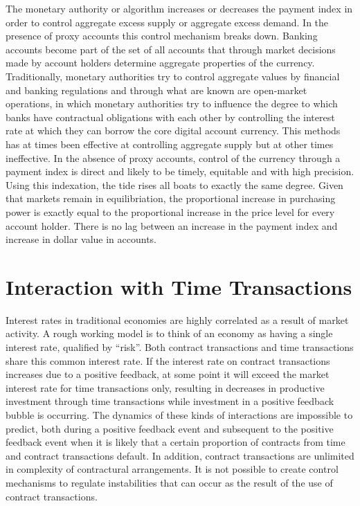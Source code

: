 The monetary authority or algorithm increases or decreases the payment index in order to control
aggregate excess supply or aggregate excess demand. In the presence of proxy accounts this control
mechanism breaks down. Banking accounts become part of the set of all accounts that through market
decisions made by account holders determine aggregate properties of the currency. Traditionally,
monetary authorities try to control aggregate values by financial and banking regulations and
through what are known are open-market operations, in which monetary authorities try to influence
the degree to which banks have contractual obligations with each other by controlling the interest
rate at which they can borrow the core digital account currency. This methods has at times been
effective at controlling aggregate supply but at other times ineffective. In the absence of proxy
accounts, control of the currency through a payment index is direct and likely to be timely,
equitable and with high precision. Using this indexation, the tide rises all boats to exactly the
same degree. Given that markets remain in equilibriation, the proportional increase in purchasing
power is exactly equal to the proportional increase in the price level for every account holder.
There is no lag between an increase in the payment index and increase in dollar value in accounts.   

\section{Interaction with Time Transactions}

Interest rates in traditional economies are highly correlated as a result of market activity. A
rough working model is to think of an economy as having a single interest rate, qualified by
``risk''.  Both contract transactions and time transactions share this common interest rate. If the
interest rate on contract transactions increases due to a positive feedback, at some point
it will exceed the market interest rate for time transactions only, resulting in decreases in
productive investment through time transactions while investment in a positive feedback bubble is
occurring. The dynamics of these kinds of interactions are impossible to predict, both during a
positive feedback event and subsequent to the positive feedback event when it is likely that a
certain proportion of contracts from time and contract transactions default. In addition, contract
transactions are unlimited in complexity of contractural arrangements. It is not possible to create
control mechanisms to regulate instabilities that can occur as the result of the use of contract
transactions.

